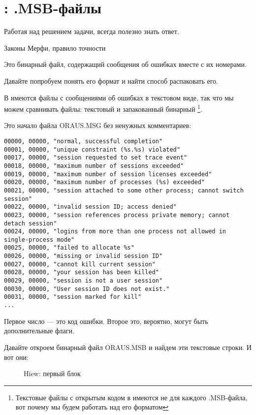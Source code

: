 ﻿\section{\oracle: .MSB-файлы\ESph{}\PTBRph{}\PLph{}\ITAph{}\DEph{}\NLph{}}
\myindex{\oracle}

\epigraph{Работая над решением задачи, всегда полезно знать ответ.}{Законы Мерфи, правило точности}

Это бинарный файл, содержащий сообщения об ошибках вместе с их номерами.

Давайте попробуем понять его формат и найти способ распаковать его.

В \oracle имеются файлы с сообщениями об ошибках в текстовом виде, так что мы можем сравнивать файлы:
текстовый и запакованный бинарный
\footnote{Текстовые файлы с открытым кодом в \oracle имеются не для каждого .MSB-файла, вот почему мы будем работать над его форматом}.

Это начало файла ORAUS.MSG без ненужных комментариев:

\begin{lstlisting}[caption=Начало файла ORAUS.MSG без комментариев]
00000, 00000, "normal, successful completion"
00001, 00000, "unique constraint (%s.%s) violated"
00017, 00000, "session requested to set trace event"
00018, 00000, "maximum number of sessions exceeded"
00019, 00000, "maximum number of session licenses exceeded"
00020, 00000, "maximum number of processes (%s) exceeded"
00021, 00000, "session attached to some other process; cannot switch session"
00022, 00000, "invalid session ID; access denied"
00023, 00000, "session references process private memory; cannot detach session"
00024, 00000, "logins from more than one process not allowed in single-process mode"
00025, 00000, "failed to allocate %s"
00026, 00000, "missing or invalid session ID"
00027, 00000, "cannot kill current session"
00028, 00000, "your session has been killed"
00029, 00000, "session is not a user session"
00030, 00000, "User session ID does not exist."
00031, 00000, "session marked for kill"
...
\end{lstlisting}

Первое число --- это код ошибки.
Второе это, вероятно, могут быть дополнительные флаги.

\clearpage
Давайте откроем бинарный файл ORAUS.MSB и найдем эти текстовые строки. 
И вот они:

\begin{figure}[H]
\centering
{}
\caption{Hiew: первый блок}
\label{fig:oracle_MSB_1}
\end{figure}

